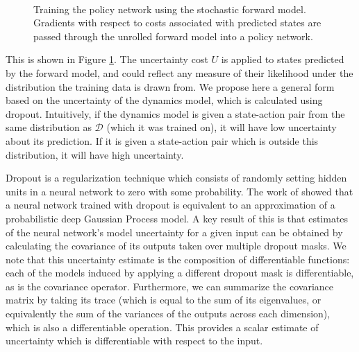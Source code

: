 \documentclass{article} %
\begin{document}
\begin{figure}[t!]
    \centering
     \\
    \caption{Training the policy network using the stochastic forward model. Gradients with respect to costs associated with predicted states are passed through the unrolled forward model into a policy network.}
    \label{svg}
\end{figure}
        

        This is shown in Figure \ref{svg}. The uncertainty cost $U$ is applied to states predicted by the forward model, and could reflect any measure of their likelihood under the distribution the training data is drawn from.
        We propose here a general form based on the uncertainty of the dynamics model, which is calculated using dropout.
        Intuitively, if the dynamics model is given a state-action pair from the same distribution as $\mathcal{D}$ (which it was trained on), it will have low uncertainty about its prediction.
        If it is given a state-action pair which is outside this distribution, it will have high uncertainty.



    Dropout \citep{Dropout2012, Dropout2014} is a regularization technique which consists of randomly setting hidden units in a neural network to zero with some probability.
    The work of \citep{Gal16} showed that a neural network trained with dropout is equivalent to an approximation of a probabilistic deep Gaussian Process model.
    A key result of this is that estimates of the neural network's model uncertainty for a given input can be obtained by calculating the covariance of its outputs taken over multiple dropout masks.
    We note that this uncertainty estimate is the composition of differentiable functions: each of the models induced by applying a different dropout mask is differentiable, as is the covariance operator.
    Furthermore, we can summarize the covariance matrix by taking its trace (which is equal to the sum of its eigenvalues, or equivalently the sum of the variances of the outputs across each dimension), which is also a differentiable operation. This provides a scalar estimate of uncertainty which is differentiable with respect to the input.
\end{document}
